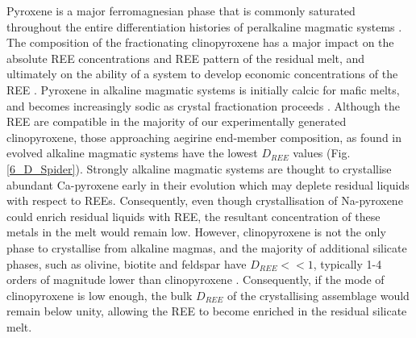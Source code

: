 \documentclass[review,authoryear,12pt]{elsarticle}
\begin{document}
	Pyroxene is a major ferromagnesian phase that is commonly saturated throughout the entire differentiation histories of peralkaline magmatic systems \citep{Ablay1998,Marks2001a,Moller2016}. The composition of the fractionating clinopyroxene has a major impact on the absolute REE concentrations and REE pattern of the residual melt, and ultimately on the ability of a system to develop economic concentrations of the REE \citep[Fig. \ref{15_Fract_Cryst}, e.g.][]{Kogarko1990, Sorensen1992, Marks2011}.
Pyroxene in alkaline magmatic systems is initially calcic for mafic melts, and becomes increasingly sodic as crystal fractionation proceeds \citep{Marks2004}. Although the REE are compatible in the majority of our experimentally generated clinopyroxene, those approaching aegirine end-member composition, as found in evolved alkaline magmatic systems have the lowest $D_{REE}$ values (Fig. \ref{6_D_Spider}). Strongly alkaline magmatic systems are thought to crystallise abundant Ca-pyroxene early in their evolution which may deplete residual liquids with respect to REEs. Consequently, even though crystallisation of Na-pyroxene could enrich residual liquids with REE, the resultant concentration of these metals in the melt would remain low. 
    However, clinopyroxene is not the only phase to crystallise from alkaline magmas, and the majority of additional silicate phases, such as olivine, biotite and feldspar have $D_{REE} << 1$, typically 1-4 orders of magnitude lower than clinopyroxene \citep{Larsen1979,Kovalenko1988, Mahood1990}.
     Consequently, if the mode of clinopyroxene is low enough, the bulk $D_{REE}$ of the crystallising assemblage would remain below unity, allowing the REE to become enriched in the residual silicate melt.


\end{document}
